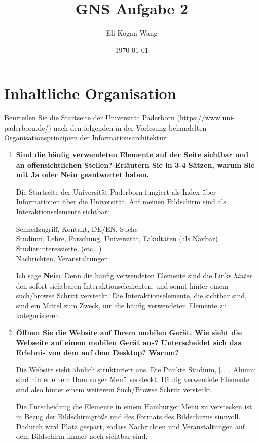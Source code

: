 \documentclass[a4paper,12pt]{article}
\title{GNS Aufgabe 2}
\author{Eli Kogan-Wang}
\date{\today}
\begin{document}

\section{Inhaltliche Organisation}
Beurteilen Sie die Startseite der Universität Paderborn
(https://www.uni-paderborn.de/) nach den folgenden in der Vorlesung behandelten
Organisationsprinzipien der Informationsarchitektur:
\begin{enumerate}[label=\alph*)]
  \item \textbf{Sind die häufig verwendeten Elemente auf der Seite sichtbar und an
          offensichtlichen Stellen? Erläutern Sie in 3-4 Sätzen, warum Sie mit Ja oder
          Nein geantwortet haben.}

        Die Startseite der Universität Paderborn fungiert als Index über Informationen über die Universität.
        Auf meinen Bildschirm sind als Interaktionselemente sichtbar:

        Schnellzugriff, Kontakt, DE/EN, Suche \\
        Studium, Lehre, Forschung, Universität, Fakultäten (als Navbar) \\
        Studieninteressierte, (etc...)\\
        Nachrichten, Veranstaltungen

        Ich sage \textbf{Nein}. Denn die häufig verwendeten Elemente sind die Links \textit{hinter} den
        sofort sichtbaren Interaktionselementen, und somit hinter einem such/browse Schritt versteckt.
        Die Interaktionselemente, die sichtbar sind, sind ein Mittel zum Zweck, um die häufig
        verwendeten Elemente zu kategorisieren.

  \item \textbf{Öffnen Sie die Website auf Ihrem mobilen Gerät. Wie sieht die Webseite auf
          einem mobilen Gerät aus? Unterscheidet sich das Erlebnis von dem auf dem
          Desktop? Warum?}

        Die Website sieht ähnlich strukturiert aus. Die Punkte Studium, [...], Alumni sind
        hinter einem Hamburger Menü versteckt. Häufig verwendete Elemente sind also
        hinter einem weiterem Such/Browse Schritt versteckt.

        Die Entscheidung die Elemente in einem Hamburger Menü zu verstecken ist
        in Bezug der Bildschirmgröße und des Formats des Bildschirms sinnvoll.
        Dadurch wird Platz gespart, sodass Nachrichten und Veranstaltungen
        auf dem Bildschirm immer noch sichtbar sind.


\end{enumerate}
\end{document}
